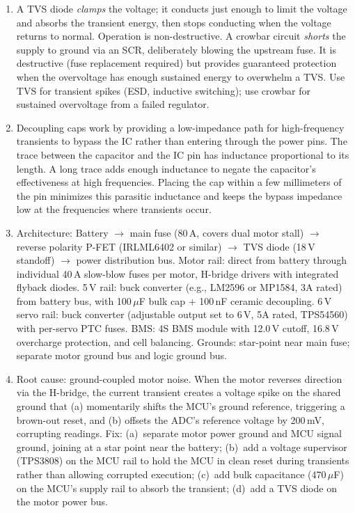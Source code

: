 \begin{enumerate}[leftmargin=1.5em]
  \item A TVS diode \emph{clamps} the voltage; it conducts just enough to limit the voltage and absorbs the transient energy, then stops conducting when the voltage returns to normal. Operation is non-destructive. A crowbar circuit \emph{shorts} the supply to ground via an SCR, deliberately blowing the upstream fuse. It is destructive (fuse replacement required) but provides guaranteed protection when the overvoltage has enough sustained energy to overwhelm a TVS. Use TVS for transient spikes (ESD, inductive switching); use crowbar for sustained overvoltage from a failed regulator.

  \item Decoupling caps work by providing a low-impedance path for high-frequency transients to bypass the IC rather than entering through the power pins. The trace between the capacitor and the IC pin has inductance proportional to its length. A long trace adds enough inductance to negate the capacitor's effectiveness at high frequencies. Placing the cap within a few millimeters of the pin minimizes this parasitic inductance and keeps the bypass impedance low at the frequencies where transients occur.

  \item Architecture: Battery $\to$ main fuse (80\,A, covers dual motor stall) $\to$ reverse polarity P-FET (IRLML6402 or similar) $\to$ TVS diode (18\,V standoff) $\to$ power distribution bus. Motor rail: direct from battery through individual 40\,A slow-blow fuses per motor, H-bridge drivers with integrated flyback diodes. 5\,V rail: buck converter (e.g., LM2596 or MP1584, 3A rated) from battery bus, with 100\,$\mu$F bulk cap + 100\,nF ceramic decoupling. 6\,V servo rail: buck converter (adjustable output set to 6\,V, 5A rated, TPS54560) with per-servo PTC fuses. BMS: 4S BMS module with 12.0\,V cutoff, 16.8\,V overcharge protection, and cell balancing. Grounds: star-point near main fuse; separate motor ground bus and logic ground bus.

  \item Root cause: ground-coupled motor noise. When the motor reverses direction via the H-bridge, the current transient creates a voltage spike on the shared ground that (a) momentarily shifts the MCU's ground reference, triggering a brown-out reset, and (b) offsets the ADC's reference voltage by 200\,mV, corrupting readings. Fix: (a)~separate motor power ground and MCU signal ground, joining at a star point near the battery; (b)~add a voltage supervisor (TPS3808) on the MCU rail to hold the MCU in clean reset during transients rather than allowing corrupted execution; (c)~add bulk capacitance (470\,$\mu$F) on the MCU's supply rail to absorb the transient; (d)~add a TVS diode on the motor power bus.


\end{enumerate}
